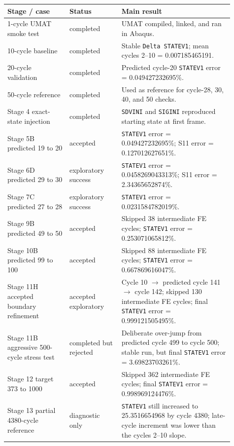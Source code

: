 \documentclass[11pt,a4paper]{article}
\begin{document}
\begin{longtable}{p{0.25\linewidth}p{0.21\linewidth}p{0.45\linewidth}}
\toprule
Stage / case & Status & Main result \\
\midrule
\endhead
1-cycle UMAT smoke test & completed & UMAT compiled, linked, and ran in Abaqus. \\
10-cycle baseline & completed & Stable \texttt{Delta STATEV1}; mean cycles 2--10 = 0.007185465191. \\
20-cycle validation & completed & Predicted cycle-20 \texttt{STATEV1} error = 0.049427232695\%. \\
50-cycle reference & completed & Used as reference for cycle-28, 30, 40, and 50 checks. \\
Stage 4 exact-state injection & completed & \texttt{SDVINI} and \texttt{SIGINI} reproduced starting state at first frame. \\
Stage 5B predicted 19 to 20 & accepted & \texttt{STATEV1} error = 0.049427232695\%; S11 error = 0.127012627651\%. \\
Stage 6D predicted 29 to 30 & exploratory success & \texttt{STATEV1} error = 0.0458269043313\%; S11 error = 2.34365652874\%. \\
Stage 7C predicted 27 to 28 & exploratory success & \texttt{STATEV1} error = 0.0231584782019\%. \\
Stage 9B predicted 49 to 50 & accepted & Skipped 38 intermediate FE cycles; \texttt{STATEV1} error = 0.253071065812\%. \\
Stage 10B predicted 99 to 100 & accepted & Skipped 88 intermediate FE cycles; \texttt{STATEV1} error = 0.667869616047\%. \\
Stage 11H accepted boundary refinement & accepted exploratory & Cycle 10 $\rightarrow$ predicted cycle 141 $\rightarrow$ cycle 142; skipped 130 intermediate FE cycles; final \texttt{STATEV1} error = 0.999121505495\%. \\
Stage 11B aggressive 500-cycle stress test & completed but rejected & Deliberate over-jump from predicted cycle 499 to cycle 500; stable run, but final \texttt{STATEV1} error = 3.69823703261\%. \\
Stage 12 target 373 to 1000 & accepted & Skipped 362 intermediate FE cycles; final \texttt{STATEV1} error = 0.998969124476\%. \\
Stage 13 partial 4380-cycle reference & diagnostic only & \texttt{STATEV1} still increased to 25.3516654968 by cycle 4380; late-cycle increment was lower than the cycles 2--10 slope. \\
\bottomrule
\end{longtable}
\end{document}
